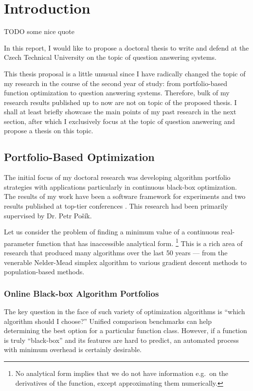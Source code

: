 \chapter{Introduction}
\label{ch:intro}

TODO some nice quote

In this report, I would like to propose a doctoral thesis to write
and defend at the Czech Technical University on the topic of question
answering systems.

This thesis proposal is a little unusual since I have radically changed
the topic of my research in the course of the second year of study:
from portfolio-based function optimization to question answering systems.
Therefore, bulk of my research results published up to now are not
on topic of the proposed thesis.  I shall at least briefly showcase
the main points of my past research in the next section,
after which I exclusively focus at the topic of question answering
and propose a thesis on this topic.

\section{Portfolio-Based Optimization}

The initial focus of my doctoral research
was developing algorithm portfolio strategies
with applications particularly in continuous black-box optimization.
The results of my work have been a software framework for experiments
\cite{COCOpf}
and two results published at top-tier conferences \cite{optpf,ndsqistep}.
This research had been primarily supervised by Dr. Petr Pošík.

Let us consider the problem of finding a minimum value of a continuous
real-parameter function that has inaccessible analytical form.%
\footnote{No analytical form implies that we do not have information
e.g.\ on the derivatives of the function, except approximating
them numerically.}
This is a rich area of research that produced many algorithms over
the last 50 years --- from the venerable Nelder-Mead simplex
algorithm \cite{NM1} to various gradient descent methods to
population-based methods.

\subsection{Online Black-box Algorithm Portfolios}

The key question in the face of such variety of optimization
algorithms is ``which algorithm should I choose?''
Unified comparison benchmarks \cite{COCO1}
can help determining the best option for a particular function class.
However, if a function is truly ``black-box'' and its features
are hard to predict, an automated process with minimum overhead
is certainly desirable.


